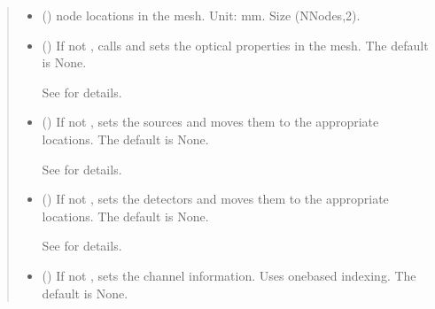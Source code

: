 \documentclass[letterpaper,10pt,english]{sphinxmanual}
\begin{document}
\begin{fulllineitems}
\begin{fulllineitems}
\begin{quote}
\begin{description}
\begin{itemize}
\item {} 
\sphinxAtStartPar
{} () \textendash{} node locations in the mesh. Unit: mm. Size (NNodes,2).

\item {} 
\sphinxAtStartPar
{} (\sphinxstyleliteralemphasis{\sphinxupquote{, }}) \textendash{} 
\sphinxAtStartPar
If not , calls  and sets the optical properties in the mesh. The default is None.

\sphinxAtStartPar
See {\hyperref[\detokenize{_autosummary/nirfasterff.base.fluor_mesh.fluormesh:nirfasterff.base.fluor_mesh.fluormesh.set_prop}]{}} for details.


\item {} 
\sphinxAtStartPar
{} (\sphinxstyleliteralemphasis{\sphinxupquote{, }}) \textendash{} 
\sphinxAtStartPar
If not , sets the sources and moves them to the appropriate locations. The default is None.

\sphinxAtStartPar
See {\hyperref[\detokenize{_autosummary/nirfasterff.base.optodes.optode:nirfasterff.base.optodes.optode.touch_sources}]{}} for details.


\item {} 
\sphinxAtStartPar
{} (\sphinxstyleliteralemphasis{\sphinxupquote{, }}) \textendash{} 
\sphinxAtStartPar
If not , sets the detectors and moves them to the appropriate locations. The default is None.

\sphinxAtStartPar
See {\hyperref[\detokenize{_autosummary/nirfasterff.base.optodes.optode:nirfasterff.base.optodes.optode.touch_detectors}]{}} for details.


\item {} 
\sphinxAtStartPar
{} (\sphinxstyleliteralemphasis{\sphinxupquote{, }}) \textendash{} 
\sphinxAtStartPar
If not , sets the channel information. Uses one\sphinxhyphen{}based indexing. The default is None.


\end{itemize}
\end{description}
\end{quote}
\end{fulllineitems}
\end{fulllineitems}
\end{document}
